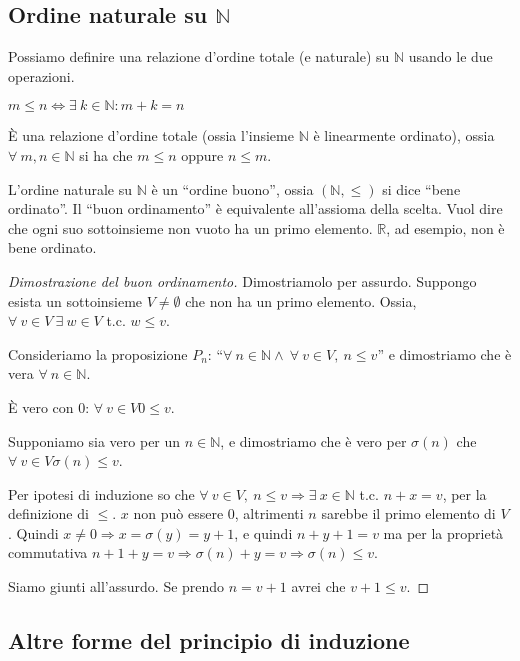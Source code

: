 \subsection{Ordine naturale su $\mathbb{N}$}

Possiamo definire una relazione d'ordine totale (e naturale) su $\mathbb{N}$ usando le due operazioni.
\begin{defn}
$m \le n \Leftrightarrow \exists \ k \in \mathbb{N} : m + k = n$
\end{defn}
\`E una relazione d'ordine totale (ossia l'insieme $\mathbb{N}$ \`e linearmente ordinato), ossia $\forall \ m, n \in \mathbb{N}$ si ha che $ m \le n$ oppure $n \le m$.

L'ordine naturale su $\mathbb{N}$ \`e un ``ordine buono'', ossia $(\mathbb{N}, \le)$ si dice ``bene ordinato''. Il ``buon ordinamento'' \`e equivalente all'assioma della scelta. Vuol dire che ogni suo sottoinsieme non vuoto ha un primo elemento. $\mathbb{R}$, ad esempio, non \`e bene ordinato.
\begin{proof}[Dimostrazione del buon ordinamento]
Dimostriamolo per assurdo. Suppongo esista un sottoinsieme $V \neq \emptyset$ che non ha un primo elemento. Ossia, $\forall \ v \in V \ \exists \ w \in V$ t.c. $w \le v$.

Consideriamo la proposizione $P_n$: ``$\forall \ n \in \mathbb{N} \land \ \forall \ v \in V, \ n \le v$'' e dimostriamo che \`e vera $\forall \ n \in \mathbb{N}$.

\`E vero con 0: $\forall \ v \in V 0 \le v$.

Supponiamo sia vero per un $n \in \mathbb{N}$, e dimostriamo che \`e vero per $\sigma(n) $ che $ \forall \ v \in V \sigma(n) \le v$.

Per ipotesi di induzione so che $\forall \ v \in V, \ n \le v \Rightarrow \exists \ x \in \mathbb{N}$ t.c. $n + x = v$, per la definizione di $\le$. $x$ non pu\`o essere 0, altrimenti $n$ sarebbe il primo elemento di $V$. Quindi $x \neq 0 \Rightarrow x = \sigma(y) = y + 1$, e quindi $n + y + 1 = v $ ma per la propriet\`a commutativa $n + 1 + y = v \Rightarrow \sigma(n) + y = v \Rightarrow \sigma(n) \le v$.

Siamo giunti all'assurdo. Se prendo $n = v + 1$ avrei che $v + 1 \le v$.
\end{proof}

\subsection{Altre forme del principio di induzione}

